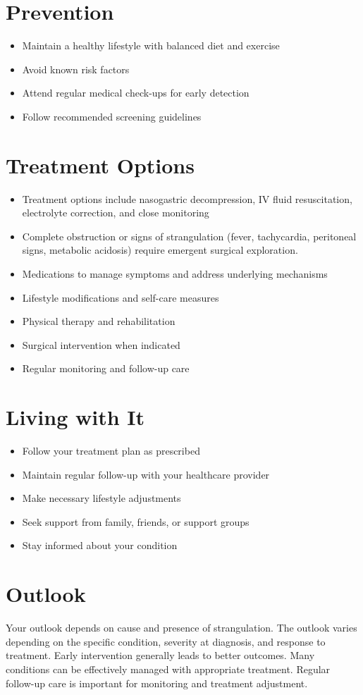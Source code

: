 \section{Prevention}
\begin{itemize}[noitemsep]
  \item Maintain a healthy lifestyle with balanced diet and exercise
  \item Avoid known risk factors
  \item Attend regular medical check-ups for early detection
  \item Follow recommended screening guidelines
\end{itemize}
\section{Treatment Options}
\begin{itemize}[noitemsep]
  \item Treatment options include nasogastric decompression, IV fluid resuscitation, electrolyte correction, and close monitoring
  \item Complete obstruction or signs of strangulation (fever, tachycardia, peritoneal signs, metabolic acidosis) require emergent surgical exploration.
  \item Medications to manage symptoms and address underlying mechanisms
  \item Lifestyle modifications and self-care measures
  \item Physical therapy and rehabilitation
  \item Surgical intervention when indicated
  \item Regular monitoring and follow-up care
\end{itemize}
\section{Living with It}
\begin{itemize}[noitemsep]
  \item Follow your treatment plan as prescribed
  \item Maintain regular follow-up with your healthcare provider
  \item Make necessary lifestyle adjustments
  \item Seek support from family, friends, or support groups
  \item Stay informed about your condition
\end{itemize}
\section{Outlook}
Your outlook depends on cause and presence of strangulation. The outlook varies depending on the specific condition, severity at diagnosis, and response to treatment. Early intervention generally leads to better outcomes. Many conditions can be effectively managed with appropriate treatment. Regular follow-up care is important for monitoring and treatment adjustment.
